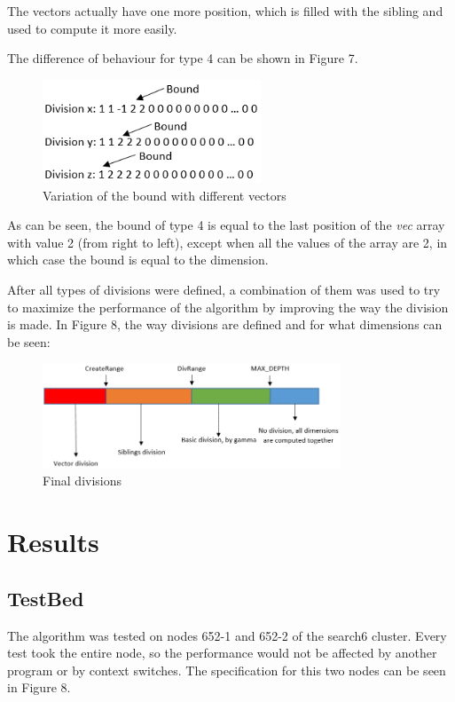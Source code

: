 \documentclass[conference]{IEEEtran}
\begin{document}
The vectors actually have one more position, which is filled with the sibling and used to compute it more easily.

The difference of behaviour for type 4 can be shown in Figure 7.

\begin{figure}[ht!]
\centering
\includegraphics[width=65mm]{imgParallel/Type4}
\caption{Variation of the bound with different vectors}
\end{figure}

As can be seen, the bound of type 4 is equal to the last position of the \emph{vec} array with value 2 (from right to left), except when all the values of the array are 2, in which case the bound is equal to the dimension. 

After all types of divisions were defined, a combination of them was used to try to maximize the performance of the algorithm by improving the way the division is made. In Figure 8, the way divisions are defined and for what dimensions can be seen:

\begin{figure}[ht!]
\centering
\includegraphics[width=89mm]{imgParallel/TotalDivisions}
\caption{Final divisions}
\end{figure}

\section{Results} 
\subsection{TestBed}
The algorithm was tested on nodes 652-1 and 652-2 of the search6 cluster. Every test took the entire node, so the performance would not be affected by another program or by context switches. The specification for this two nodes can be seen in Figure 8.
\end{document}
